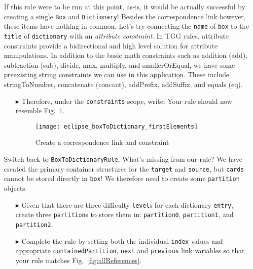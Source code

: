 If this rule were to be run at this point, as-is, it would be actually successful by creating a single \texttt{Box} and \texttt{Dictionary}! Besides the
correspondence link however, these items have nothing in common. Let's try connecting the \texttt{name} of \texttt{box} to the \texttt{title} of \texttt{dictionary} with an
\emph{attribute constraint}. In TGG rules, attribute constraints provide a bidirectional and high level solution for attribute manipulations. In addition to the
basic math constraints such as addition (add), subtraction (sub), divide, max, multiply, and smallerOrEqual, we have some preexisting string constraints
we can use in this application. These include stringToNumber, concatenate (concant), addPrefix, addSuffix, and equals (eq).

\begin{itemize}

\item[$\blacktriangleright$] Therefore, under the \texttt{constraints} scope, write:
Your rule should now resemble Fig.~\ref{fig:ruleBasic}.

\vspace{0.5cm}

\begin{figure}[htbp]
\begin{center}
  \texttt{[image: eclipse\_boxToDictionary\_firstElements]}
  \caption{Create a correspondence link and constraint}
  \label{fig:ruleBasic}
\end{center}
\end{figure}

\end{itemize}

Switch back to \texttt{BoxToDictionaryRule}. What's missing from our rule? We have created the primary container structures for the \texttt{target} and
\texttt{source}, but \texttt{cards} cannot be stored directly in \texttt{box}! We therefore need to create some \texttt{partition} objects. 

\begin{itemize}

\item[$\blacktriangleright$] Given that there are three difficulty \texttt{level}s for each dictionary \texttt{entry}, create three \texttt{partition}s to
store them in: \texttt{partition0}, \texttt{partition1}, and \texttt{partition2}. 

\vspace{0.5cm}

\item[$\blacktriangleright$] Complete the rule by setting both the individual \texttt{index} values and appropriate \texttt{containedPartition},
\texttt{next} and \texttt{previous} link variables so that your rule matches Fig.~\ref{fig:allReferences}.

\end{itemize}

